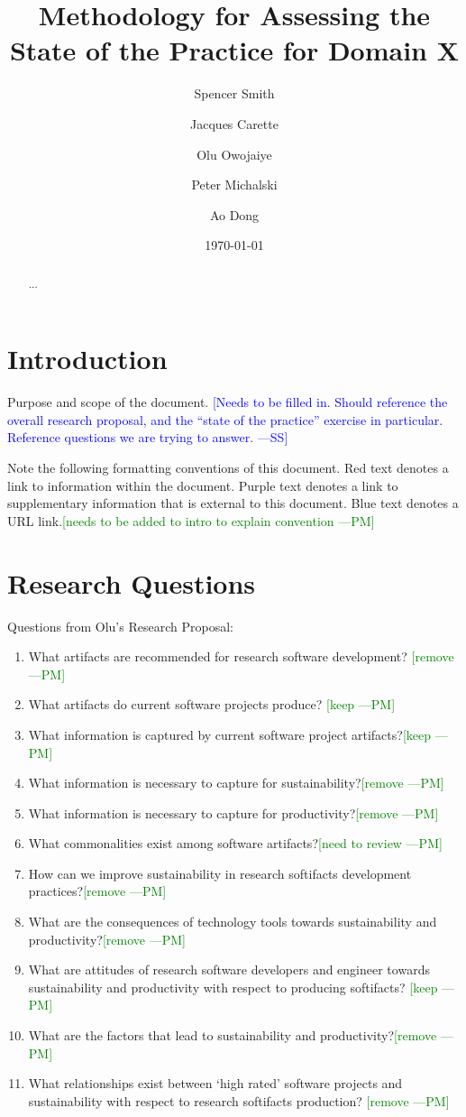 \documentclass[letterpaper,cleveref]{lipics-v2019}
\title{Methodology for Assessing the State of the Practice for Domain X}
\author{Spencer Smith}{McMaster University, Canada}{smiths@mcmaster.ca}{}{}
\author{Jacques Carette}{McMaster University, Canada}{carette@mcmaster.ca}{}{}
\author{Olu Owojaiye}{McMaster University, Canada}{owojaiyo@mcmaster.ca}{}{}
\author{Peter Michalski}{McMaster University, Canada}{michap@mcmaster.ca}{}{}
\author{Ao Dong}{McMaster University, Canada}{donga9@mcmaster.ca}{}{}
\date{\today}
\newcommand{\authornote}[3]{\textcolor{#1}{[#3 ---#2]}}
\newcommand{\authornote}[3]{}
\newcommand{\wss}[1]{\authornote{blue}{SS}{#1}} %
\newcommand{\pmi}[1]{\authornote{green}{PM}{#1}} %
\theoremstyle{definition}
\begin{document}
\maketitle

\begin{abstract}
	...
\end{abstract}

\tableofcontents

\section{Introduction} \label{SecIntroduction}

Purpose and scope of the document.  \wss{Needs to be filled in.  Should
	reference the overall research proposal, and the ``state of the practice''
	exercise in particular.  Reference questions we are trying to answer.}

Note the following formatting conventions of this document. Red text denotes a link to information within the document. Purple text denotes a link to supplementary information that is external to this document. Blue text denotes a URL link.\pmi{needs to be added to intro to explain convention} 

\section{Research Questions}\label{ResearchQuestions}

Questions from Olu's Research Proposal:
	\begin{enumerate} 
		\item What artifacts are recommended for research software development?
\pmi{remove}
		\item What artifacts do current software projects produce?
\pmi{keep}
\item What information is captured by current software project artifacts?\pmi{keep}
\item What information is necessary to capture for sustainability?\pmi{remove}
\item What information is necessary to capture for productivity?\pmi{remove}
\item What commonalities exist among software artifacts?\pmi{need to review}
\item How can we improve sustainability in research softifacts development practices?\pmi{remove}
\item What are the consequences of technology tools towards sustainability and productivity?\pmi{remove}
\item What are attitudes of research software developers and engineer towards sustainability and productivity with respect to producing softifacts? \pmi{keep}
\item What are the factors that lead to sustainability and productivity?\pmi{remove}
\item What relationships exist between `high rated' software projects and sustainability with respect to research softifacts production? \pmi{remove}
\end{enumerate}
\end{document}
